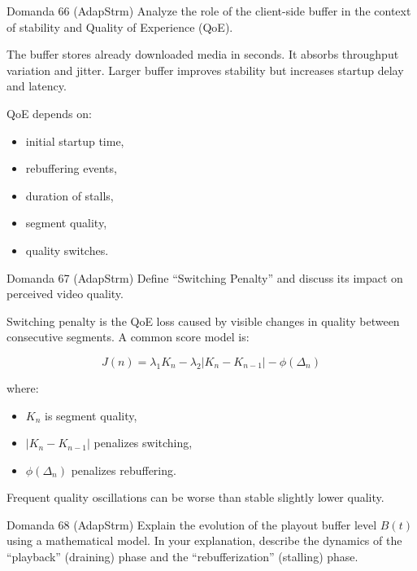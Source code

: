 \begin{questionbox}{Domanda 66}
(AdapStrm) Analyze the role of the client-side buffer in the context of stability and Quality of Experience (QoE).
\end{questionbox}


The buffer stores already downloaded media in seconds. It absorbs throughput variation and jitter. Larger buffer improves stability but increases startup delay and latency.

QoE depends on:

\begin{itemize}
  \item initial startup time,
  \item rebuffering events,
  \item duration of stalls,
  \item segment quality,
  \item quality switches.
\end{itemize}



\begin{questionbox}{Domanda 67}
(AdapStrm) Define “Switching Penalty” and discuss its impact on perceived video quality.
\end{questionbox}


Switching penalty is the QoE loss caused by visible changes in quality between consecutive segments. A common score model is:


$$
J(n)=\lambda_1K_n-\lambda_2|K_n-K_{n-1}|-\phi(\Delta_n)
$$


where:

\begin{itemize}
  \item $K_n$ is segment quality,
  \item $|K_n-K_{n-1}|$ penalizes switching,
  \item $\phi(\Delta_n)$ penalizes rebuffering.
\end{itemize}

Frequent quality oscillations can be worse than stable slightly lower quality.

\begin{tcolorbox}[colback=white, colframe=gray!50, height=4.5cm, sharp corners]
\end{tcolorbox}



\begin{questionbox}{Domanda 68}
(AdapStrm) Explain the evolution of the playout buffer level $B(t)$ using a mathematical model. In your explanation, describe the dynamics of the “playback” (draining) phase and the “rebufferization” (stalling) phase.
\end{questionbox}


